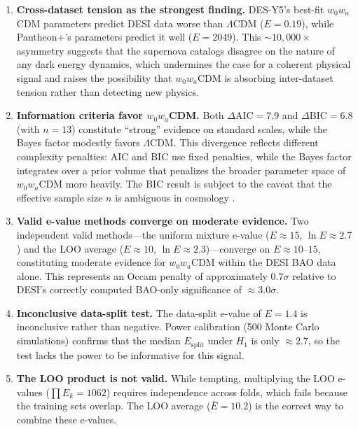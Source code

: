 \documentclass[11pt,a4paper]{article}
\newcommand{\LCDM}{$\Lambda$CDM}
\begin{document}
\begin{enumerate}
    \item \textbf{Cross-dataset tension as the strongest finding.} DES-Y5's best-fit $w_0w_a$CDM parameters predict DESI data worse than \LCDM{} ($E = 0.19$), while Pantheon+'s parameters predict it well ($E = 2049$). This ${\sim}10{,}000\times$ asymmetry suggests that the supernova catalogs disagree on the nature of any dark energy dynamics, which undermines the case for a coherent physical signal and raises the possibility that $w_0w_a$CDM is absorbing inter-dataset tension rather than detecting new physics.

    \item \textbf{Information criteria favor $w_0w_a$CDM.} Both $\Delta\text{AIC} = 7.9$ and $\Delta\text{BIC} = 6.8$ (with $n = 13$) constitute ``strong'' evidence on standard scales, while the Bayes factor modestly favors \LCDM{}. This divergence reflects different complexity penalties: AIC and BIC use fixed penalties, while the Bayes factor integrates over a prior volume that penalizes the broader parameter space of $w_0w_a$CDM more heavily. The BIC result is subject to the caveat that the effective sample size $n$ is ambiguous in cosmology \citep{Liddle2007}.

    \item \textbf{Valid e-value methods converge on moderate evidence.} Two independent valid methods---the uniform mixture e-value ($E \approx 15$, $\ln E \approx 2.7$) and the LOO average ($E \approx 10$, $\ln E \approx 2.3$)---converge on $E \approx 10$--$15$, constituting moderate evidence for $w_0w_a$CDM within the DESI BAO data alone. This represents an Occam penalty of approximately $0.7\sigma$ relative to DESI's correctly computed BAO-only significance of $\approx 3.0\sigma$.

    \item \textbf{Inconclusive data-split test.} The data-split e-value of $E = 1.4$ is inconclusive rather than negative. Power calibration (500 Monte Carlo simulations) confirms that the median $E_{\text{split}}$ under $H_1$ is only $\approx 2.7$, so the test lacks the power to be informative for this signal.

    \item \textbf{The LOO product is not valid.} While tempting, multiplying the LOO e-values ($\prod E_k = 1062$) requires independence across folds, which fails because the training sets overlap. The LOO average ($\bar{E} = 10.2$) is the correct way to combine these e-values.
\end{enumerate}
\end{document}
